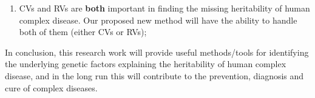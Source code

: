 \documentclass[compress]{beamer}
\begin{document}
{\begin{scriptsize}
\begin{enumerate}
\item CVs and RVs are \textbf{both} important in finding the missing heritability of human complex disease. Our proposed new method will have the ability to handle both of them (either CVs or RVs);
\end{enumerate}
In conclusion, this research work will provide useful methods/tools for identifying the underlying genetic
factors explaining the heritability of human complex disease, and in the long run this will
contribute to the prevention, diagnosis and cure of complex diseases.

\end{scriptsize}

}


\end{document}
